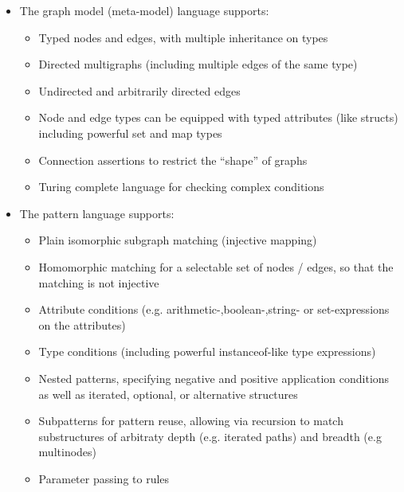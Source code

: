 \begin{itemize}
  \item The graph model (meta-model) language supports:
  \begin{itemize}
    \item Typed nodes and edges, with multiple inheritance on types
    \item Directed multigraphs (including multiple edges of the same type)
    \item Undirected and arbitrarily directed edges
    \item Node and edge types can be equipped with typed attributes (like structs) including powerful set and map types
    \item Connection assertions to restrict the ``shape'' of graphs
    \item Turing complete language for checking complex conditions
  \end{itemize}
  
  \item The pattern language supports:
  \begin{itemize}
    \item Plain isomorphic subgraph matching (injective mapping)
    \item Homomorphic matching for a selectable set of nodes / edges, so that the matching is not injective
    \item Attribute conditions (e.g. arithmetic-,boolean-,string- or set-expressions on the attributes)
    \item Type conditions (including powerful instanceof-like type expressions)
    \item Nested patterns, specifying negative and positive application conditions as well as iterated, optional, or alternative structures
    \item Subpatterns for pattern reuse, allowing via recursion to match substructures of arbitraty depth (e.g. iterated paths) and breadth (e.g multinodes)
    \item Parameter passing to rules
  \end{itemize}
  

\end{itemize}
